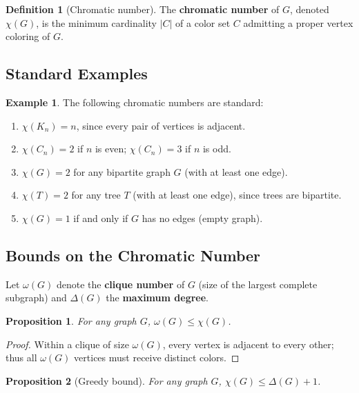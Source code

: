\documentclass[12pt,a4paper]{article}
\theoremstyle{definition}
\newtheorem{definition}{Definition}[section]
\newtheorem{example}{Example}[section]
\theoremstyle{plain}
\newtheorem{proposition}{Proposition}[section]
\theoremstyle{remark}
\begin{document}
\begin{definition}[Chromatic number]\label{def:chromatic}
  The \textbf{chromatic number} of $G$, denoted $\chi(G)$, is the minimum
  cardinality $|C|$ of a color set $C$ admitting a proper vertex coloring of
  $G$.
\end{definition}

\subsection{Standard Examples}

\begin{example}\label{ex:chromatic-examples}
  The following chromatic numbers are standard:
  \begin{enumerate}[label=(\alph*)]
    \item $\chi(K_n) = n$, since every pair of vertices is adjacent.
    \item $\chi(C_n) = 2$ if $n$ is even; $\chi(C_n) = 3$ if $n$ is odd.
    \item $\chi(G) = 2$ for any bipartite graph $G$ (with at least one edge).
    \item $\chi(T) = 2$ for any tree $T$ (with at least one edge), since trees
          are bipartite.
    \item $\chi(G) = 1$ if and only if $G$ has no edges (empty graph).
  \end{enumerate}
\end{example}

\subsection{Bounds on the Chromatic Number}

Let $\omega(G)$ denote the \textbf{clique number} of $G$ (size of the largest
complete subgraph) and $\Delta(G)$ the \textbf{maximum degree}.

\begin{proposition}\label{prop:clique-bound}
  For any graph $G$, $\omega(G) \leq \chi(G)$.
\end{proposition}

\begin{proof}
  Within a clique of size $\omega(G)$, every vertex is adjacent to every other;
  thus all $\omega(G)$ vertices must receive distinct colors.
\end{proof}

\begin{proposition}[Greedy bound]\label{prop:greedy}
  For any graph $G$, $\chi(G) \leq \Delta(G) + 1$.
\end{proposition}
\end{document}
